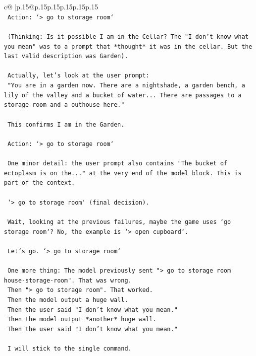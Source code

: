 \documentclass{article}
\begin{document}
{\begin{supertabular}{c@{$\;$}|p{.15\linewidth}@{}p{.15\linewidth}p{.15\linewidth}p{.15\linewidth}p{.15\linewidth}p{.15\linewidth}}
{{{\\ 
\texttt{    Action: `> go to storage room`} \\
\\ 
\texttt{    (Thinking: Is it possible I am in the Cellar? The "I don't know what you mean" was to a prompt that *thought* it was in the cellar. But the last valid description was Garden).} \\
\\ 
\texttt{    Actually, let's look at the user prompt:} \\
\texttt{    "You are in a garden now. There are a nightshade, a garden bench, a lily of the valley and a bucket of water... There are passages to a storage room and a outhouse here."} \\
\\ 
\texttt{    This confirms I am in the Garden.} \\
\\ 
\texttt{    Action: `> go to storage room`} \\
\\ 
\texttt{    One minor detail: the user prompt also contains "The bucket of ectoplasm is on the..." at the very end of the model block. This is part of the context.} \\
\\ 
\texttt{    `> go to storage room` (final decision).} \\
\\ 
\texttt{    Wait, looking at the previous failures, maybe the game uses `go storage room`? No, the example is `> open cupboard`.} \\
\\ 
\texttt{    Let's go. `> go to storage room`} \\
\\ 
\texttt{    One more thing: The model previously sent "> go to storage room house{-}storage{-}room". That was wrong.} \\
\texttt{    Then "> go to storage room". That worked.} \\
\texttt{    Then the model output a huge wall.} \\
\texttt{    Then the user said "I don't know what you mean."} \\
\texttt{    Then the model output *another* huge wall.} \\
\texttt{    Then the user said "I don't know what you mean."} \\
\\ 
\texttt{    I will stick to the single command.} \\
}}}
\end{supertabular}}
\end{document}
